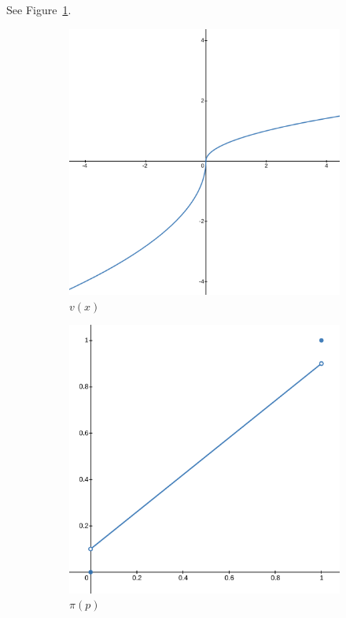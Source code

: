 \documentclass{article}
\begin{document}
\subsection{}
See Figure~\ref{fig:fig1}.
\begin{figure}[ht!]
\begin{subfigure}[h]{0.45\linewidth}
  \includegraphics[width=\linewidth]{img/hw_5_1.png}
  \caption{$v(x)$}
\end{subfigure}
\hfill
\begin{subfigure}[h]{0.45\linewidth}
  \includegraphics[width=\linewidth]{img/hw_5_2.png}
  \caption{$\pi(p)$}
\end{subfigure}
\caption{}
\label{fig:fig1}
\end{figure}
\end{document}
